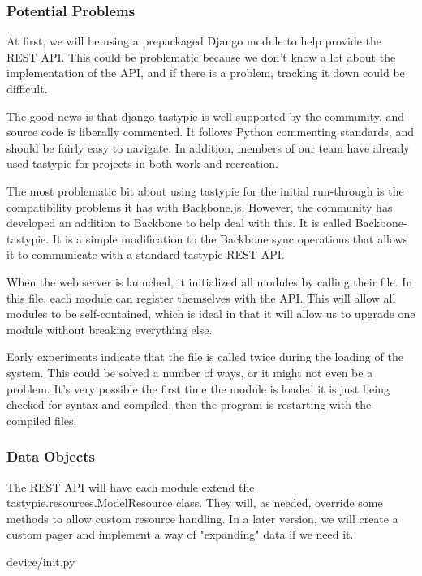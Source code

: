 \subsubsection{Potential Problems}

At first, we will be using a prepackaged Django module to help provide the \ac{REST} \ac{API}.
This could be problematic because we don't know a lot about the implementation of the \ac{API}, and if there is a problem, tracking it down could be difficult.

The good news is that django-tastypie is well supported by the community, and source code is liberally commented.
It follows Python commenting standards, and should be fairly easy to navigate.
In addition, members of our team have already used tastypie for projects in both work and recreation.

The most problematic bit about using tastypie for the initial run-through is the compatibility problems it has with Backbone.js.
However, the community has developed an addition to Backbone to help deal with this.
It is called Backbone-tastypie.
It is a simple modification to the Backbone sync operations that allows it to communicate with a standard tastypie \ac{REST} \ac{API}.

When the web server is launched, it initialized all modules by calling their  file.
In this file, each module can register themselves with the \ac{API}.
This will allow all modules to be self-contained, which is ideal in that it will allow us to upgrade one module without breaking everything else.

Early experiments indicate that the  file is called twice during the loading of the system.
This could be solved a number of ways, or it might not even be a problem. 
It's very possible the first time the module is loaded it is just being checked for syntax and compiled, then the program is restarting with the compiled files.

\subsubsection{Data Objects}

The REST API will have each module extend the tastypie.resources.ModelResource class. 
They will, as needed, override some methods to allow custom resource handling.
In a later version, we will create a custom pager and implement a way of "expanding" data if we need it.

\begin{table}[H]
  \centering
  \caption{device/init.py}
  \label{code:device/init}
  
\end{table}

